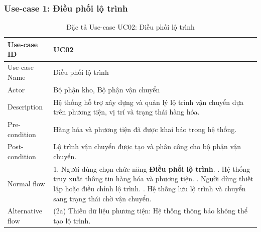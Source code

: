 \subsubsection{Use-case 1: Điều phối lộ trình}
\begin{table}[H]
\centering
\begin{tabularx}{\textwidth}{|l|X|}
\hline
Use-case ID & UC02 \\ \hline
Use-case Name & Điều phối lộ trình \\ \hline
Actor & Bộ phận kho, Bộ phận vận chuyển \\ \hline
Description & Hệ thống hỗ trợ xây dựng và quản lý lộ trình vận chuyển dựa trên phương tiện, vị trí và trạng thái hàng hóa. \\ \hline
Pre-condition & Hàng hóa và phương tiện đã được khai báo trong hệ thống. \\ \hline
Post-condition & Lộ trình vận chuyển được tạo và phân công cho bộ phận vận chuyển. \\ \hline
Normal flow &
1. Người dùng chọn chức năng \textbf{Điều phối lộ trình}. \newline
2. Hệ thống truy xuất thông tin hàng hóa và phương tiện. \newline
3. Người dùng thiết lập hoặc điều chỉnh lộ trình. \newline
4. Hệ thống lưu lộ trình và chuyển sang trạng thái chờ vận chuyển. \\ \hline
Alternative flow &
(2a) Thiếu dữ liệu phương tiện: Hệ thống thông báo không thể tạo lộ trình. \\ \hline
\end{tabularx}
\caption{Đặc tả Use-case UC02: Điều phối lộ trình}
\end{table}

